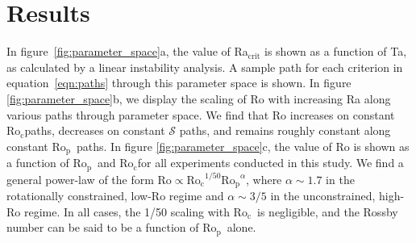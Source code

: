 \documentclass[twocolumn, amsmath, amsfonts, amssymb]{aastex62}
\newcommand{\grad}{\ensuremath{\nabla}}
\newcommand{\pro}{\ensuremath{\text{Ro}_{\text{p}}}}
\newcommand{\con}{\ensuremath{\text{Ro}_{\text{c}}}}
\begin{document}


\section{Results}
\label{sec:results}
In figure~\ref{fig:parameter_space}a, the value of Ra$_{\text{crit}}$
is shown as a function of Ta, as
calculated by a linear instability analysis. A sample path for
each criterion in equation~\ref{eqn:paths} through
this parameter space is shown.
In figure \ref{fig:parameter_space}b, we display the scaling of Ro
with increasing Ra along various paths through parameter space.
We find that Ro increases on constant \con paths, decreases on constant $\mathcal{S}$
paths, and remains roughly constant along constant \pro$\,$ paths.
In figure \ref{fig:parameter_space}c, the value of Ro is shown as
a function of \pro$\,$ and \con for all experiments conducted in this study.
We find a general power-law of the form $\text{Ro} \propto \con^{1/50}\pro^{\alpha}$,
where $\alpha \sim 1.7$ in the rotationally constrained, low-Ro regime and
$\alpha \sim 3/5$ in the unconstrained, high-Ro regime. In all cases, the 1/50
scaling with \con$\,$ is negligible, and the Rossby number can be said to be a function
of \pro$\,$ alone.
\end{document}
